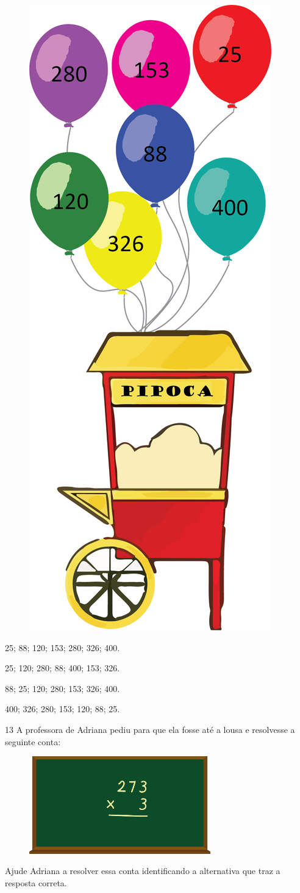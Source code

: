 \begin{figure}[htpb!]
\centering
\includegraphics[width=.3\textwidth]{./media/image98.png}
\end{figure}

\begin{escolha}
\item
  25; 88; 120; 153; 280; 326; 400.
\item
  25; 120; 280; 88; 400; 153; 326.
\item
  88; 25; 120; 280; 153; 326; 400.
\item
  400; 326; 280; 153; 120; 88; 25.
\end{escolha}

\pagebreak

\num{13} A professora de Adriana pediu para que ela fosse até a lousa e resolvesse a seguinte conta:

\begin{figure}[htpb!]
\centering
\includegraphics[width=0.7\textwidth]{./media/image99.png}
\end{figure}

Ajude Adriana a resolver essa conta identificando a alternativa que traz a resposta correta.


